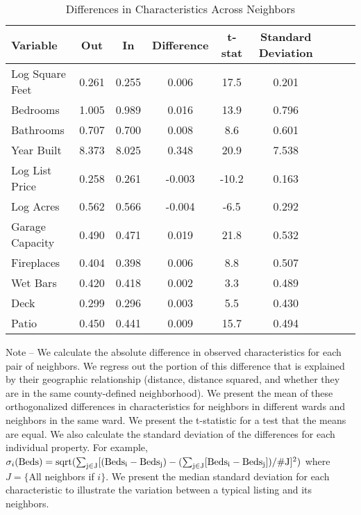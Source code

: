 \documentclass[AEJ,draftmode]{AEA}
\begin{document}
\begin{table}[ht]
\centering
\caption{Differences in Characteristics Across Neighbors}
\begin{tabular}{@{}lcccccccc@{}} \toprule
Variable        & Out   & In    & Difference   & t-stat   & Standard Deviation\\\midrule
Log Square Feet & 0.261 & 0.255 & 0.006        & 17.5     &  0.201\\
Bedrooms        & 1.005 & 0.989 & 0.016        & 13.9     &  0.796\\
Bathrooms       & 0.707 & 0.700 & 0.008        & 8.6      &  0.601\\
Year Built      & 8.373 & 8.025 & 0.348        & 20.9     &  7.538\\
Log List Price  & 0.258 & 0.261 & -0.003       & -10.2    &  0.163\\
Log Acres       & 0.562 & 0.566 & -0.004       & -6.5     &  0.292\\
Garage Capacity & 0.490 & 0.471 & 0.019        & 21.8     &  0.532\\
Fireplaces      & 0.404 & 0.398 & 0.006        & 8.8      &  0.507\\
Wet Bars        & 0.420 & 0.418 & 0.002        & 3.3      &  0.489\\
Deck            & 0.299 & 0.296 & 0.003        & 5.5      &  0.430\\
Patio           & 0.450 & 0.441 & 0.009        & 15.7     &  0.494\\\bottomrule
\end{tabular}
\begin{minipage}{.88\hsize}
{\footnotesize Note -- We calculate the absolute difference in observed characteristics for each pair of neighbors. We regress out the portion of this difference that is explained by their geographic relationship (distance, distance squared, and whether they are in the same county-defined neighborhood). We present the mean of these orthogonalized differences in characteristics for neighbors in different wards and neighbors in the same ward. We present the     t-statistic for a test that the means are equal. We also calculate the standard deviation of the differences for each individual property. For example,  $ \sigma_i(\rm{Beds}) = sqrt(\sum_{j \in J}[(Beds_i - Beds_j) - (\sum_{j \in J}[Beds_i - Beds_j])/\#J]^2)$  where $J = \{$All neighbors if $i\}$. We present the median standard deviation for each characteristic to illustrate the variation between a typical listing and its neighbors.}
\end{minipage}
\end{table}
%
%
%
\end{document}
